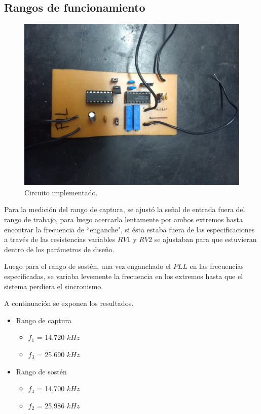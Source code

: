 \documentclass[twocolumn]{article}
\begin{document}
\subsection{Rangos de funcionamiento}
\begin{figure}[H]
  \centering    
  \includegraphics[width=\columnwidth]{imagenes/jona.jpg}
	\caption{Circuito implementado.}\label{fig:fig6}
\end{figure}

Para la medición del rango de captura, se ajustó la señal de entrada fuera del rango de trabajo, para luego acercarla lentamente por ambos extremos hasta encontrar la frecuencia de ``enganche", si ésta estaba fuera de las especificaciones a través de las resistencias variables $RV1$ y $RV2$ se ajustaban para que estuvieran dentro de los parámetros de diseño.

Luego para el rango de sostén, una vez enganchado el $PLL$ en las frecuencias especificadas, se variaba levemente la frecuencia en los extremos hasta que el sistema perdiera el sincronismo.

A continuación se exponen los resultados.
\begin{itemize}
	\item Rango de captura
		\begin{itemize}
			\item $f_1$ = 14,720 $kHz$
			\item $f_3$ = 25,690 $kHz$
		\end{itemize}
	\item Rango de sostén
		\begin{itemize}
		  \item $f_4$ = 14,700 $kHz$
		  \item $f_2$ = 25,986 $kHz$
		\end{itemize}
\end{itemize}
\end{document}
